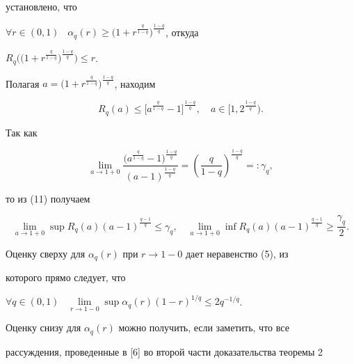 установлено, что


$\forall r\in(0,1)$ \ $\alpha_q(r)\geq\big(1+r^{\frac{q}{1-q}}\big)^


{\frac{1-q}{q}}$, откуда


$R_q\big(\big(1+r^{\frac{q}{1-q}}\big)^{\frac{1-q}{q}}\big)\leq r$.


Полагая $a=\big(1+r^{\frac{q}{1-q}}\big)^{\frac{1-q}{q}}$, находим


\begin{equation}


R_q(a)\leq\big[a^{\frac{q}{1-q}}-1\big]^{\frac{1-q}{q}},


\quad a\in\big[1,2^{\frac{1-q}{q}}\big).


\end{equation}


Так как


$$


\lim_{a\to 1+0}\frac{\big(a^{\frac{q}{1-q}}-1\big)^


{\frac{1-q}{q}}}{(a-1)^{\frac{1-q}{q}}}=


\left(\frac{q}{1-q}\right)^{\frac{1-q}{q}}=:\gamma_q,


$$


то из (11) получаем





\begin{cornonum} \phantom{m}


$$


\lim\limits_{a\to 1+0}\sup R_q(a)(a-1)^


{\frac{q-1}{q}}\leq \gamma_q,


\quad \lim\limits_{a\to 1+0}\inf R_q(a)(a-1)^


{\frac{q-1}{q}}\geq\frac{\gamma_q}{2}.


$$


\end{cornonum}





Оценку сверху для $\alpha_q(r)$ при $r\to 1-0$ дает неравенство (5), из


которого прямо следует, что


$\forall q\in(0,1)$ \ $\lim\limits_{r\to 1-0}


\sup\alpha_q(r)(1-r)^{1/q}\leq 2q^{-1/q}$.


Оценку снизу для $\alpha_q(r)$ можно получить, если заметить, что все


рассуждения, проведенные в [6] во второй части доказательства теоремы 2


